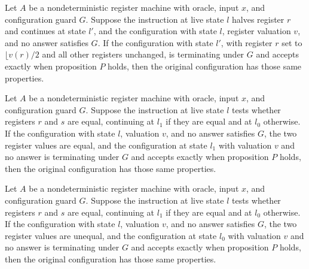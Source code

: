 \begin{lemma}
\label{Complexity.LogProg.NSem.half}
\leanok
{}
Let $A$ be a nondeterministic register machine with oracle, input $x$, and configuration
guard $G$. Suppose the instruction at live state $l$ halves register $r$ and continues
at state $l'$, and the configuration with state $l$, register valuation $v$, and no
answer satisfies $G$. If the configuration with state $l'$, with register $r$ set to
$\lfloor{v(r)/2}$ and all other registers unchanged, is terminating under $G$ and accepts
exactly when proposition $P$ holds, then the original configuration has those same
properties.
\end{lemma}

\begin{lemma}
\label{Complexity.LogProg.NSem.jeq_pos}
\leanok
{}
Let $A$ be a nondeterministic register machine with oracle, input $x$, and configuration
guard $G$. Suppose the instruction at live state $l$ tests whether registers $r$ and $s$
are equal, continuing at $l_1$ if they are equal and at $l_0$ otherwise. If the
configuration with state $l$, valuation $v$, and no answer satisfies $G$, the two
register values are equal, and the configuration at state $l_1$ with valuation $v$ and
no answer is terminating under $G$ and accepts exactly when proposition $P$ holds, then
the original configuration has those same properties.
\end{lemma}

\begin{lemma}
\label{Complexity.LogProg.NSem.jeq_neg}
\leanok
{}
Let $A$ be a nondeterministic register machine with oracle, input $x$, and configuration
guard $G$. Suppose the instruction at live state $l$ tests whether registers $r$ and $s$
are equal, continuing at $l_1$ if they are equal and at $l_0$ otherwise. If the
configuration with state $l$, valuation $v$, and no answer satisfies $G$, the two
register values are unequal, and the configuration at state $l_0$ with valuation $v$ and
no answer is terminating under $G$ and accepts exactly when proposition $P$ holds, then
the original configuration has those same properties.
\end{lemma}

